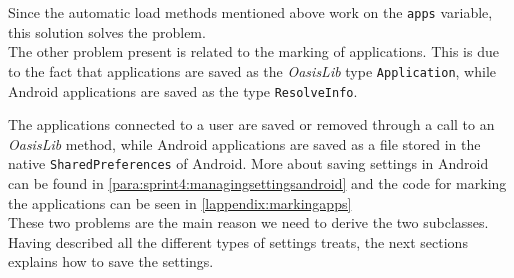 Since the automatic load methods mentioned above work on the \lstinline!apps! variable, this solution solves the problem. \\

The other problem present is related to the marking of applications.
This is due to the fact that \giraf applications are saved as the \textit{OasisLib} type \lstinline!Application!, while Android applications are saved as the type \lstinline!ResolveInfo!.

The \giraf applications connected to a user are saved or removed through a call to an \textit{OasisLib} method, while Android applications are saved as a file stored in the native \lstinline!SharedPreferences! of Android.
More about saving settings in Android can be found in \cref{para:sprint4:managingsettingsandroid} and the code for marking the applications can be seen in \cref{lappendix:markingapps}\\


These two problems are the main reason we need to derive the two subclasses.\\

Having described all the different types of settings \launcher treats, the next sections explains how to save the settings.